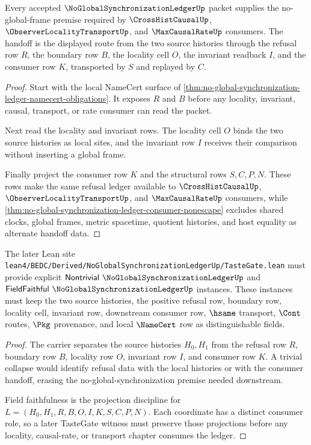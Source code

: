 \begin{theorem}
\label{thm:no-global-synchronization-ledger-inter-hist-handoff}
Every accepted $\NoGlobalSynchronizationLedgerUp$ packet supplies the no-global-frame premise required by $\CrossHistCausalUp$, $\ObserverLocalityTransportUp$, and $\MaxCausalRateUp$ consumers. The handoff is the displayed route from the two source histories through the refusal row $R$, the boundary row $B$, the locality cell $O$, the invariant readback $I$, and the consumer row $K$, transported by $S$ and replayed by $C$.
\end{theorem}
\begin{proof}
Start with the local NameCert surface of \autoref{thm:no-global-synchronization-ledger-namecert-obligations}. It exposes $R$ and $B$ before any locality, invariant, causal, transport, or rate consumer can read the packet.

Next read the locality and invariant rows. The locality cell $O$ binds the two source histories as local sites, and the invariant row $I$ receives their comparison without inserting a global frame.

Finally project the consumer row $K$ and the structural rows $S,C,P,N$. These rows make the same refusal ledger available to $\CrossHistCausalUp$, $\ObserverLocalityTransportUp$, and $\MaxCausalRateUp$ consumers, while \autoref{thm:no-global-synchronization-ledger-consumer-nonescape} excludes shared clocks, global frames, metric spacetime, quotient histories, and host equality as alternate handoff data.
\end{proof}

\begin{theorem}
\label{thm:no-global-synchronization-ledger-tastegate-obligation}
The later Lean site \texttt{lean4/BEDC/Derived/NoGlobalSynchronizationLedgerUp/TasteGate.lean} must provide explicit $\mathsf{Nontrivial}\ \NoGlobalSynchronizationLedgerUp$ and $\mathsf{FieldFaithful}\ \NoGlobalSynchronizationLedgerUp$ instances. These instances must keep the two source histories, the positive refusal row, boundary row, locality cell, invariant row, downstream consumer row, $\hsame$ transport, $\Cont$ routes, $\Pkg$ provenance, and local $\NameCert$ row as distinguishable fields.
\end{theorem}
\begin{proof}
The carrier separates the source histories $H_0,H_1$ from the refusal row $R$, boundary row $B$, locality row $O$, invariant row $I$, and consumer row $K$. A trivial collapse would identify refusal data with the local histories or with the consumer handoff, erasing the no-global-synchronization premise needed downstream.

Field faithfulness is the projection discipline for $L=(H_0,H_1,R,B,O,I,K,S,C,P,N)$. Each coordinate has a distinct consumer role, so a later TasteGate witness must preserve those projections before any locality, causal-rate, or transport chapter consumes the ledger.
\end{proof}

